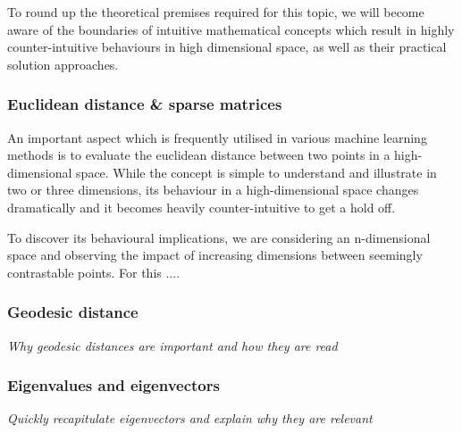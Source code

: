 
To round up the theoretical premises required for this topic, we will become aware of the boundaries of intuitive mathematical concepts which result in highly counter-intuitive behaviours in high dimensional space, as well as their practical solution approaches.

\subsubsection{Euclidean distance \& sparse matrices}

An important aspect which is frequently utilised in various machine learning methods is to evaluate the euclidean distance between two points in a high-dimensional space.
While the concept is simple to understand and illustrate in two or three dimensions, its behaviour in a high-dimensional space changes dramatically and it becomes heavily counter-intuitive to get a hold off.

To discover its behavioural implications, we are considering an n-dimensional space and observing the impact of increasing dimensions between seemingly contrastable points. 
For this .... 

\vspace{2mm}

\noindent
\begin{minipage}[t]{0.45\linewidth}

\subsubsection{Geodesic distance}

\begin{center}
	\textit{Why geodesic distances are important and how they are read}
\end{center}

\vspace{1mm}

\begin{center}
	\renewcommand{\tikzscale}{0.45}
	
	\vspace*{2mm}
	\captionsetup{justification=centering,type=htypei}
	\label{fig:geodesicdistance}
\end{center}


\end{minipage}\hfill%
\begin{minipage}[t]{0.45\linewidth}

\subsubsection{Eigenvalues and eigenvectors}

\begin{center}
	\textit{Quickly recapitulate eigenvectors and explain why they are relevant}
\end{center}


\end{minipage}%

